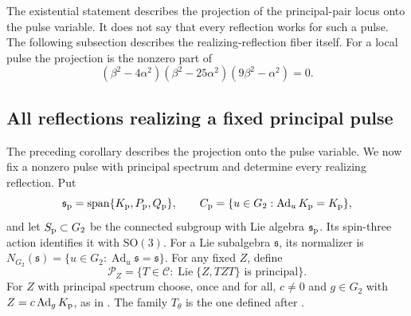 \documentclass[11pt,a4paper]{article}
\newcommand{\SO}{\mathrm{SO}}
\newcommand{\Lie}{\operatorname{Lie}}
\newcommand{\Ad}{\operatorname{Ad}}
\newcommand{\Span}{\operatorname{span}}
\begin{document}
The existential statement describes the projection of the principal-pair locus onto the pulse variable.  It does not say that every reflection works for such a pulse.  The following subsection describes the realizing-reflection fiber itself.
For a local pulse the projection is the nonzero part of
\[
(\beta^2-4\alpha^2)(\beta^2-25\alpha^2)(9\beta^2-\alpha^2)=0.
\]


\subsection{All reflections realizing a fixed principal pulse}
The preceding corollary describes the projection onto the pulse variable.  We now fix a nonzero pulse with principal spectrum and determine every realizing reflection.
Put
\[
\mathfrak s_{\rm p}=\Span\{K_{\rm p},P_{\rm p},Q_{\rm p}\},\qquad
C_{\rm p}=\{u\in G_2:\Ad_uK_{\rm p}=K_{\rm p}\},
\]
and let $S_{\rm p}\subset G_2$ be the connected subgroup with Lie algebra $\mathfrak s_{\rm p}$.
Its spin-three action identifies it with $\SO(3)$.
For a Lie subalgebra $\mathfrak s$, its normalizer is $N_{G_2}(\mathfrak s)=\{u\in G_2:\Ad_u\mathfrak s=\mathfrak s\}$.
For any fixed $Z$, define
\[
\mathscr P_Z=\{T\in\mathscr C:\Lie\{Z,TZT\}\text{ is principal}\}.
\]
For $Z$ with principal spectrum choose, once and for all, $c\ne0$ and $g\in G_2$ with $Z=c\Ad_gK_{\rm p}$, as in .
The family $T_\theta$ is the one defined after .
\end{document}
